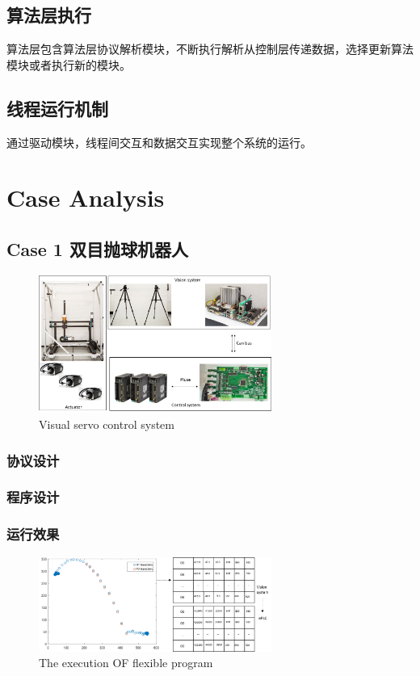 \documentclass[journal,UTF8]{IEEEtran}
\begin{document}
\subsection{算法层执行}
算法层包含算法层协议解析模块，不断执行解析从控制层传递数据，选择更新算法模块或者执行新的模块。
\subsection{线程运行机制}
通过驱动模块，线程间交互和数据交互实现整个系统的运行。


\section{Case Analysis}
\label{Case}
\subsection{Case 1 双目抛球机器人}
\begin{figure}
	\centering
	\includegraphics[width=3in]{fig/visual_control_system.png}
	\caption{ Visual servo control system}
	\label{fig:VIsualServoControlSystem}
\end{figure}
\subsubsection{协议设计}

\subsubsection{程序设计}

\subsubsection{运行效果}



\begin{figure}
	\centering
	\includegraphics[width=3in]{fig/trajectory.png}
	\caption{ The execution OF flexible program}
	\label{fig:settingexecutionbitinACPTD}
\end{figure}
\end{document}
